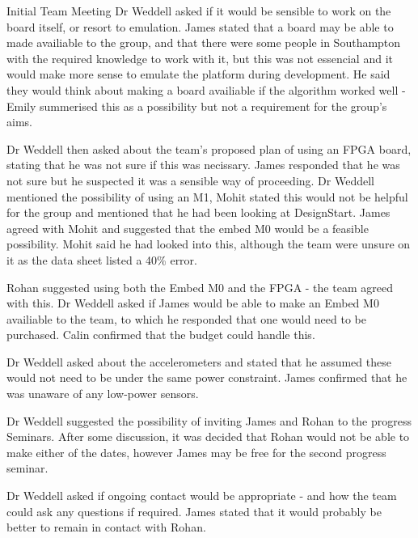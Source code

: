 \documentclass{article}
\begin{document}
\begin{Minutes}{Initial Team Meeting}
Dr Weddell asked if it would be sensible to work on the board itself, or resort to emulation. James
stated that a board may be able to made availiable to the group, and that there were some people in
Southampton with the required knowledge to work with it, but this was not essencial and it would
make more sense to emulate the platform during development. He said they would think about making a
board availiable if the algorithm worked well - Emily summerised this as a possibility but not a
requirement for the group's aims.

Dr Weddell then asked about the team's proposed plan of using an FPGA board, stating that he was not
sure if this was necissary. James responded that he was not sure but he suspected it was a sensible
way of proceeding. Dr Weddell mentioned the possibility of using an M1, Mohit stated this would not
be helpful for the group and mentioned that he had been looking at DesignStart. James agreed with
Mohit and suggested that the embed M0 would be a feasible possibility. Mohit said he had looked into
this, although the team were unsure on it as the data sheet listed a 40\% error.

Rohan suggested using both the Embed M0 and the FPGA - the team agreed with this. Dr Weddell asked if
James would be able to make an Embed M0 availiable to the team, to which he responded that one would
need to be purchased. Calin confirmed that the budget could handle this.


Dr Weddell asked about the accelerometers and stated that he assumed these would not need to be under
the same power constraint. James confirmed that he was unaware of any low-power sensors.

Dr Weddell suggested the possibility of inviting James and Rohan to the progress Seminars. After some
discussion, it was decided that Rohan would not be able to make either of the dates, however James
may be free for the second progress seminar.

Dr Weddell asked if ongoing contact would be appropriate - and how the team could ask any questions if
required. James stated that it would probably be better to remain in contact with Rohan.


\end{Minutes}
\end{document}
